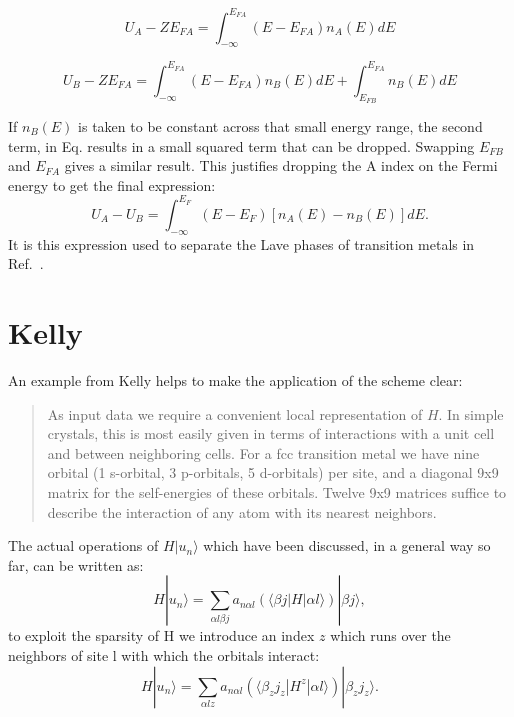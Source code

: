 \documentclass{article}
\def\ket{\rangle}
\def\bra{\langle}
\begin{document}
\begin{equation}
U_{A}-ZE_{FA}= \int_{-\infty}^{E_{FA}}(E-E_{FA})n_{A}(E)dE
\end{equation}

\begin{equation}
U_{B}-ZE_{FA}= \int_{-\infty}^{E_{FA}}(E-E_{FA})n_{B}(E)dE + \int_{E_{FB}}^{E_{FA}}n_{B}(E)dE
\end{equation}

If $n_{B}(E)$ is taken to be constant across that small energy range, the second term, in
Eq. results in a small squared term that can be dropped. Swapping $E_{FB}$ and $E_{FA}$ gives
a similar result. This justifies dropping the A index on the Fermi energy to get the
final expression:
%
\begin{equation}
U_{A}-U_{B} = \int_{-\infty}^{E_{F}}(E-E_{F})[n_{A}(E) -n_{B}(E)]dE.
\end{equation}
%
It is this expression used to separate the Lave phases of transition metals in Ref.~\cite{haydock76}.

\section{Kelly}
An example from Kelly helps to make the application of the scheme clear:
%
\begin{quote}
As input data we require a convenient local representation of $H$. In simple crystals,
this is most easily given in terms of interactions with a unit cell and between neighboring cells.
For a fcc transition metal we have nine orbital (1 s-orbital, 3 p-orbitals, 5 d-orbitals) per site, and a diagonal 9x9 matrix
for the self-energies of these orbitals. Twelve 9x9 matrices suffice to describe the interaction 
of any atom with its nearest neighbors.
\end{quote}
%

The actual operations of $H|u_{n}\ket$ which have been discussed, in a general way so far, 
can be written as:
%
\begin{equation}
H|u_{n}\ket = \sum_{\alpha l \beta j}a_{n \alpha l}(\bra \beta j |H| \alpha l\ket)|\beta j\ket,
\end{equation}
%
to exploit the sparsity of H we introduce an index $z$ which runs over the neighbors of 
site l with which the orbitals interact:
\begin{equation}
H|u_{n}\ket = \sum_{\alpha l z}a_{n \alpha l}(\bra \beta_{z} j_{z} |H^{z}|\alpha l\ket)|\beta_{z} j_{z}\ket.
\end{equation}
\end{document}
